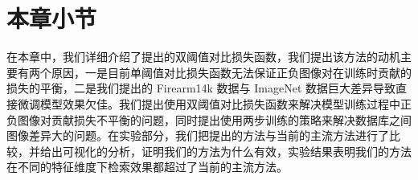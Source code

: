 \section{本章小节}\label{sec:double_margin_conclusion}
在本章中，我们详细介绍了提出的双阈值对比损失函数，我们提出该方法的动机主要有两个原因，一是目前单阈值对比损失函数无法保证正负图像对在训练时贡献的损失的平衡，二是我们提出的 Firearm14k 数据与 ImageNet 数据巨大差异导致直接微调模型效果欠佳。我们提出使用双阈值对比损失函数来解决模型训练过程中正负图像对贡献损失不平衡的问题，同时提出使用两步训练的策略来解决数据库之间图像差异大的问题。在实验部分，我们把提出的方法与当前的主流方法进行了比较，并给出可视化的分析，证明我们的方法为什么有效，实验结果表明我们的方法在不同的特征维度下检索效果都超过了当前的主流方法。
